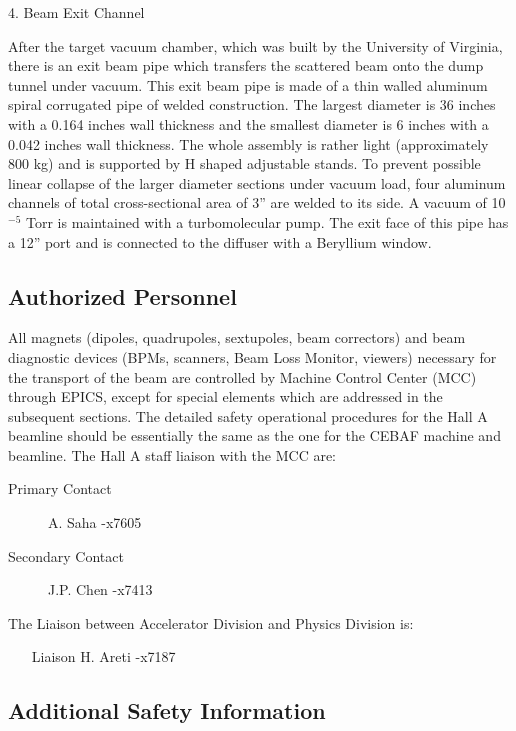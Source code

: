 \vskip 0.5cm
4. Beam Exit Channel

After the target vacuum chamber, which was built by
the University of Virginia, there is an exit beam pipe which 
transfers the scattered beam onto the dump tunnel under vacuum. This exit beam 
pipe is made of a thin walled aluminum spiral corrugated pipe of welded 
construction. The largest diameter is 36 inches with a 0.164 inches wall 
thickness and the smallest diameter is 6 inches with a 0.042 inches wall 
thickness. The whole assembly is rather light (approximately 800 kg) and is 
supported by H shaped adjustable stands. To prevent possible linear collapse 
of the larger diameter sections under vacuum load, four aluminum channels of 
total cross-sectional area of 3'' are welded to its side. A vacuum of 
10$^{-5}$ Torr is maintained with a turbomolecular pump. The exit face of this 
pipe has a 12'' port and is connected to the diffuser with a Beryllium 
window.

\subsection{ Authorized Personnel}

All magnets (dipoles, quadrupoles, sextupoles, beam correctors) and beam 
diagnostic devices (BPMs, scanners, Beam Loss Monitor, viewers) necessary for 
the transport of the beam are controlled by Machine Control Center (MCC) 
through EPICS, except for special elements which are addressed in the 
subsequent sections. The detailed safety operational procedures for the Hall 
A beamline should be essentially the same as the one for the CEBAF machine 
and beamline. The Hall A staff liaison with the MCC are:

\begin{description}
\item[Primary Contact]A. Saha -x7605
\item[Secondary Contact]J.P. Chen -x7413
\end{description}

The Liaison between Accelerator Division and Physics Division is:

\begin{itemize}
\item[Liaison]H. Areti -x7187
\end{itemize}

\subsection{ Additional Safety Information}

